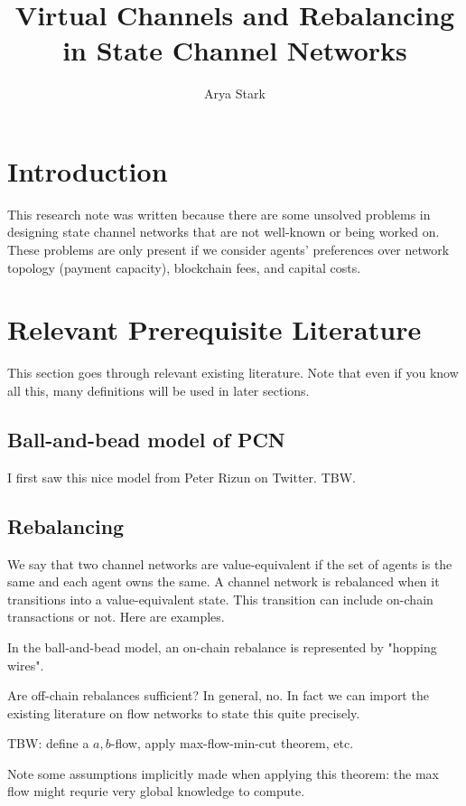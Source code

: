 \documentclass{article}
\author{Arya Stark}
\title{Virtual Channels and Rebalancing in State Channel Networks}
\date{}
\begin{document}
\maketitle

\section*{Introduction}

This research note was written because there are some unsolved problems in designing state channel networks that are not well-known or being worked on. These problems are only present if we consider agents' preferences over network topology (payment capacity), blockchain fees, and capital costs.

\section*{Relevant Prerequisite Literature}

This section goes through relevant existing literature. Note that even if you know all this, many definitions will be used in later sections.

\subsection*{Ball-and-bead model of PCN}

I first saw this nice model from Peter Rizun on Twitter. TBW.

\subsection*{Rebalancing}

We say that two channel networks are value-equivalent if the set of agents is the same and each agent owns the same. A channel network is rebalanced when it transitions into a value-equivalent state. This transition can include on-chain transactions or not. Here are examples.

In the ball-and-bead model, an on-chain rebalance is represented by "hopping wires".

Are off-chain rebalances sufficient? In general, no. In fact we can import the existing literature on flow networks to state this quite precisely.

TBW: define a $a,b$-flow, apply max-flow-min-cut theorem, etc.

Note some assumptions implicitly made when applying this theorem: the max flow might requrie very global knowledge to compute.
\end{document}
